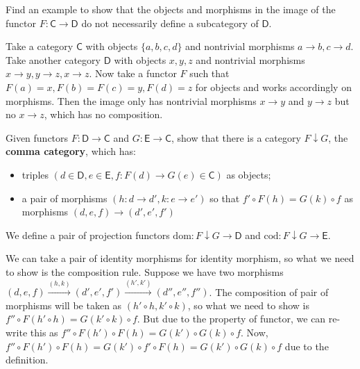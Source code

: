 \begin{exer} Find an example to show that the objects and morphisms in the image of the functor $F:\mathsf{C}\rightarrow \mathsf{D}$ do not necessarily define a subcategory of $\mathsf{D}$.
\end{exer}
\begin{solution} Take a category $\mathsf{C}$ with objects $\{a,b,c,d\}$ and nontrivial morphisms $a\rightarrow b, c\rightarrow d$. Take another category $\mathsf{D}$ with objects $x,y,z$ and nontrivial morphisms $x\rightarrow y, y\rightarrow z, x\rightarrow z$. Now take a functor $F$ such that $F(a)=x, F(b)=F(c)=y, F(d)=z$ for objects and works accordingly on morphisms. Then the image only has nontrivial morphisms $x\rightarrow y$ and $y\rightarrow z$ but no $x\rightarrow z$, which has no composition. 
\end{solution}

\begin{exer}Given functors $F:\mathsf{D}\rightarrow \mathsf{C}$ and $G:\mathsf{E}\rightarrow \mathsf{C}$, show that there is a category $F\downarrow G$, the \textbf{comma category}, which has:
\begin{itemize}
\item triples $(d\in\mathsf{D}, e\in\mathsf{E},f:F(d)\rightarrow G(e)\in\mathsf{C})$ as objects;
\item a pair of morphisms $(h:d\rightarrow d',k:e\rightarrow e')$ so that $f'\circ F(h)=G(k)\circ f$ as morphisms $(d,e,f)\rightarrow (d',e',f')$
\end{itemize}
We define a pair of projection functors $\mathrm{dom}:F\downarrow G\rightarrow \mathsf{D}$ and $\mathrm{cod}:F\downarrow G\rightarrow \mathsf{E}$.
\end{exer} 
\begin{solution} We can take a pair of identity morphisms for identity morphism, so what we need to show is the composition rule. Suppose we have two morphisms $(d,e,f)\xrightarrow{(h,k)}(d',e',f')\xrightarrow{(h',k')}(d'',e'',f'')$. The composition of pair of morphisms will be taken as $(h'\circ h,k'\circ k)$, so what we need to show is $f''\circ F(h'\circ h)=G(k'\circ k)\circ f$. But due to the property of functor, we can re-write this as $f''\circ F(h')\circ F(h)=G(k')\circ G(k)\circ f$. Now, $f''\circ F(h')\circ F(h)=G(k')\circ f'\circ F(h)=G(k')\circ G(k)\circ f$ due to the definition.
\end{solution}


